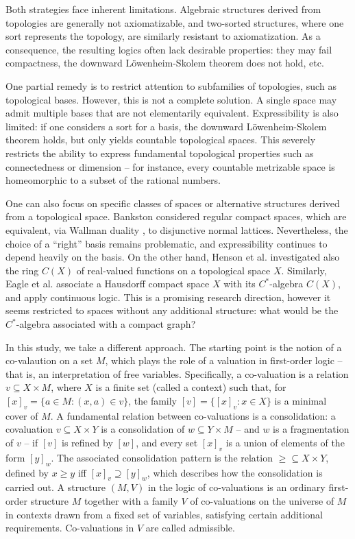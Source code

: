 \documentclass[12pt]{amsart}
\theoremstyle{plain}
\begin{document}
Both strategies face inherent limitations. Algebraic structures derived from topologies are generally not axiomatizable, and two-sorted structures, where one sort represents the topology, are similarly resistant to axiomatization. As a consequence, the resulting logics often lack desirable properties: they may fail compactness, the downward L\"owenheim-Skolem theorem does not hold, etc.

One partial remedy is to restrict attention to subfamilies of topologies, such as topological bases. However, this is not a complete solution. A single space may admit multiple bases that are not elementarily equivalent. Expressibility is also limited: if one considers a sort for a basis, the downward L\"owenheim-Skolem theorem holds, but only yields countable topological spaces. This severely restricts the ability to express fundamental topological properties such as connectedness or dimension -- for instance, every countable metrizable space is homeomorphic to a subset of the rational numbers.

 One can also focus on specific classes of spaces or alternative structures derived from a topological space. Bankston \cite{Ba} considered regular compact spaces, which are equivalent, via Wallman duality \cite{Wa}, to disjunctive normal lattices.  Nevertheless, the choice of a “right” basis remains problematic, and expressibility continues to depend heavily on the basis. On the other hand, Henson et al. \cite{Heatal} investigated also the ring $C(X)$ of real-valued functions on a topological space $X$. Similarly, Eagle et al. \cite{EaGoVi} associate a Hausdorff compact space $X$ with its $C^*$-algebra $C(X)$, and apply continuous logic. This is a promising research direction, however it seems restricted to spaces without any additional structure: what would be the $C^*$-algebra associated with a compact graph?

In this study, we take a different approach. The starting point is the notion of a co-valaution on a set $M$, which plays the role of a valuation in first-order logic -- that is, an interpretation of free variables. Specifically, a co-valuation is a relation $v \subseteq X \times M$, where $X$ is a finite set (called a context) such that, for $[x]_v=\{a \in M: (x,a) \in v\}$, the family $[v]=\{[x]_v: x \in X\}$ is a minimal  cover of $M$. A fundamental relation between co-valuations is a consolidation: a covaluation $v \subseteq X \times Y$ is a consolidation of $w \subseteq Y \times M$ -- and $w$ is a fragmentation of $v$ -- if $[v]$ is refined by $[w]$, and every set $[x]_v$ is a union of elements of the form $[y]_w$. The associated consolidation  pattern is the relation $\geq \subseteq X \times Y$, defined by $x \geq y$ iff $[x]_v \supseteq [y]_w$, which describes how the consolidation is carried out. A structure $(M,V)$ in the logic of co-valuations is an ordinary first-order structure $M$ together with a family $V$ of co-valuations on the universe of $M$ in contexts drawn from a fixed set of variables,  satisfying certain additional requirements. %
Co-valuations in $V$ are called admissible.
\end{document}
